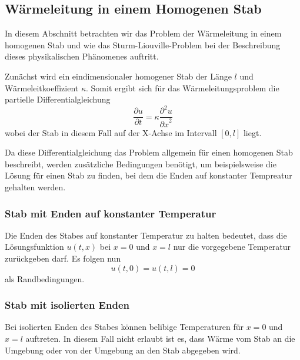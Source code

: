 %
%
%

\subsection{Wärmeleitung in einem Homogenen Stab}

In diesem Abschnitt betrachten wir das Problem der Wärmeleitung in einem
homogenen Stab und wie das Sturm-Liouville-Problem bei der Beschreibung dieses
physikalischen Phänomenes auftritt.

Zunächst wird ein eindimensionaler homogener Stab der Länge $l$ und
Wärmeleitkoeffizient $\kappa$. Somit ergibt sich für das Wärmeleitungsproblem
die partielle Differentialgleichung
\begin{equation}
    \frac{\partial u}{\partial t} =
    \kappa \frac{\partial^{2}u}{{\partial x}^{2}}
\end{equation}
wobei der Stab in diesem Fall auf der X-Achse im Intervall $[0,l]$ liegt.

Da diese Differentialgleichung das Problem allgemein für einen homogenen
Stab beschreibt, werden zusätzliche Bedingungen benötigt, um beispielsweise
die Lösung für einen Stab zu finden, bei dem die Enden auf konstanter 
Tempreatur gehalten werden.


\subsubsection{Stab mit Enden auf konstanter Temperatur}

Die Enden des Stabes auf konstanter Temperatur zu halten bedeutet, dass die
Lösungsfunktion $u(t,x)$ bei $x = 0$ und $x = l$ nur die vorgegebene
Temperatur zurückgeben darf. Es folgen nun
\begin{equation}
    u(t,0)
    =
    u(t,l)
    =
    0
\end{equation}
als Randbedingungen.


\subsubsection{Stab mit isolierten Enden}

Bei isolierten Enden des Stabes können belibige Temperaturen für $x = 0$ und
$x = l$ auftreten. In diesem Fall nicht erlaubt ist es, dass Wärme vom Stab
an die Umgebung oder von der Umgebung an den Stab abgegeben wird.

